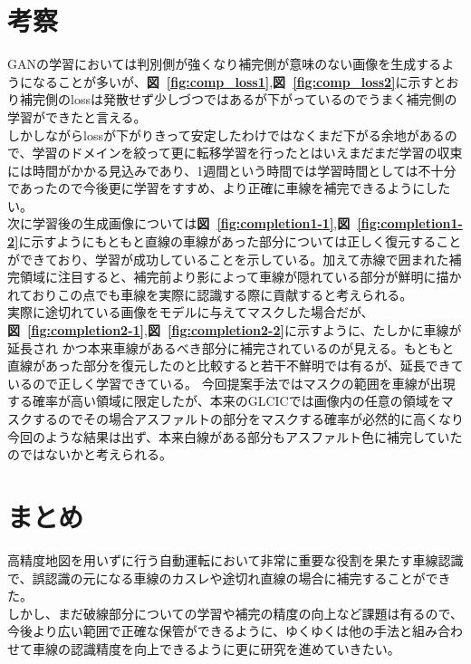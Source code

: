 \documentclass[a4j, 11pt]{jreport}
\newcommand{\figref}[1]{\textbf{図~\ref{#1}}}
\begin{document}
\chapter{考察}
GANの学習においては判別側が強くなり補完側が意味のない画像を生成するようになることが多いが、\figref{fig:comp_loss1},\figref{fig:comp_loss2}に示すとおり補完側のlossは発散せず少しづつではあるが下がっているのでうまく補完側の学習ができたと言える。\\
\indent しかしながらlossが下がりきって安定したわけではなくまだ下がる余地があるので、学習のドメインを絞って更に転移学習を行ったとはいえまだまだ学習の収束には時間がかかる見込みであり、1週間という時間では学習時間としては不十分であったので今後更に学習をすすめ、より正確に車線を補完できるようにしたい。\\
\indent 次に学習後の生成画像については\figref{fig:completion1-1},\figref{fig:completion1-2}に示すようにもともと直線の車線があった部分については正しく復元することができており、学習が成功していることを示している。加えて赤線で囲まれた補完領域に注目すると、補完前より影によって車線が隠れている部分が鮮明に描かれておりこの点でも車線を実際に認識する際に貢献すると考えられる。\\
\indent 実際に途切れている画像をモデルに与えてマスクした場合だが、\figref{fig:completion2-1},\figref{fig:completion2-2}に示すように、たしかに車線が延長され
かつ本来車線があるべき部分に補完されているのが見える。もともと直線があった部分を復元したのと比較すると若干不鮮明では有るが、延長できているので正しく学習できている。
今回提案手法ではマスクの範囲を車線が出現する確率が高い領域に限定したが、本来のGLCICでは画像内の任意の領域をマスクするのでその場合アスファルトの部分をマスクする確率が必然的に高くなり今回のような結果は出ず、本来白線がある部分もアスファルト色に補完していたのではないかと考えられる。
\chapter{まとめ}
高精度地図を用いずに行う自動運転において非常に重要な役割を果たす車線認識で、誤認識の元になる車線のカスレや途切れ直線の場合に補完することができた。\\しかし、まだ破線部分についての学習や補完の精度の向上など課題は有るので、今後より広い範囲で正確な保管ができるように、ゆくゆくは他の手法と組み合わせて車線の認識精度を向上できるように更に研究を進めていきたい。
\end{document}
